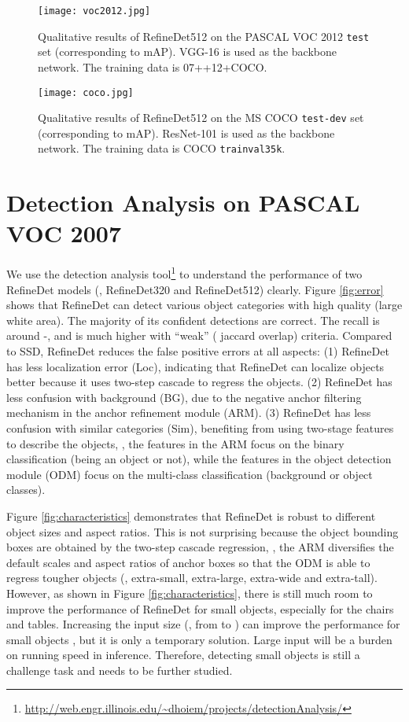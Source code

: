 \documentclass[10pt,twocolumn,letterpaper]{article}
\begin{document}
\begin{figure*}
\centering
\texttt{[image: voc2012.jpg]}
\caption{Qualitative results of RefineDet512 on the PASCAL VOC 2012 {\tt test} set (corresponding to  mAP). VGG-16 is used as the backbone network. The training data is 07++12+COCO.}
\label{fig:pascal-voc-2012}
\end{figure*}

\begin{figure*}
\centering
\texttt{[image: coco.jpg]}
\caption{Qualitative results of RefineDet512 on the MS COCO {\tt test-dev} set (corresponding to  mAP). ResNet-101 is used as the backbone network. The training data is COCO {\tt trainval35k}.}
\label{fig:coco}
\end{figure*}

\section{Detection Analysis on PASCAL VOC 2007}
We use the detection analysis tool\footnote{\url{http://web.engr.illinois.edu/~dhoiem/projects/detectionAnalysis/}} to understand the performance of two RefineDet models (\ie, RefineDet320 and RefineDet512) clearly. Figure \ref{fig:error} shows that RefineDet can detect various object categories with high quality (large white area). The majority of its confident detections are correct. The recall is around -, and is much higher with ``weak'' ( jaccard overlap) criteria. Compared to SSD, RefineDet reduces the false positive errors at all aspects: (1) RefineDet has less localization error (Loc), indicating that RefineDet can localize objects better because it uses two-step cascade to regress the objects. (2) RefineDet has less confusion with background (BG), due to the negative anchor filtering mechanism in the anchor refinement module (ARM). (3) RefineDet has less confusion with similar categories (Sim), benefiting from using two-stage features to describe the objects, \ie, the features in the ARM focus on the binary classification (being an object or not), while the features in the object detection module (ODM) focus on the multi-class classification (background or object classes).

Figure \ref{fig:characteristics} demonstrates that RefineDet is robust to different object sizes and aspect ratios. This is not surprising because the object bounding boxes are obtained by the two-step cascade regression, \ie, the ARM diversifies the default scales and aspect ratios of anchor boxes so that the ODM is able to regress tougher objects (\eg, extra-small, extra-large, extra-wide and extra-tall). However, as shown in Figure \ref{fig:characteristics}, there is still much room to improve the performance of RefineDet for small objects, especially for the chairs and tables. Increasing the input size (\eg, from  to ) can improve the performance for small objects , but it is only a temporary solution. Large input will be a burden on running speed in inference. Therefore, detecting small objects is still a challenge task and needs to be further studied.
\end{document}
